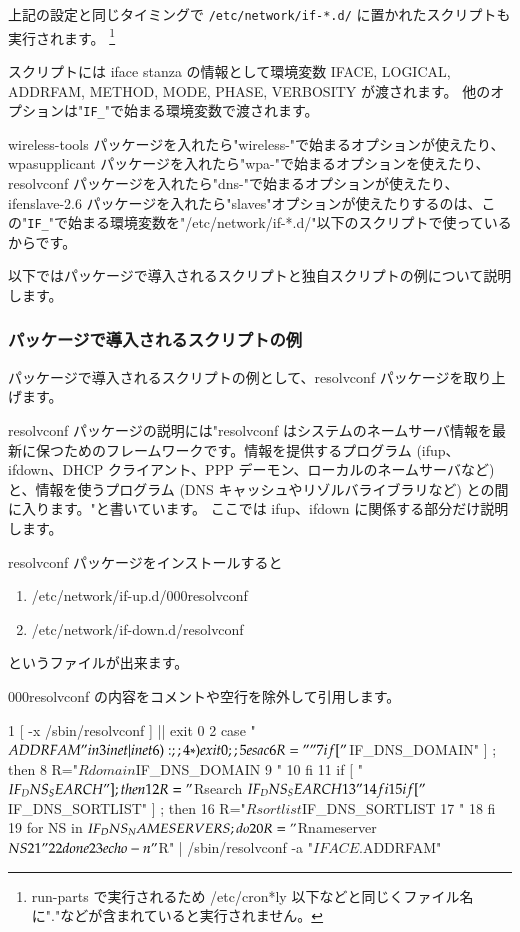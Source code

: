 \documentclass[mingoth,a4paper,twoside]{jsarticle}
\begin{document}
上記の設定と同じタイミングで \verb+/etc/network/if-*.d/+ に置かれたスクリプトも実行されます。
\footnote{run-parts で実行されるため /etc/cron*ly 以下などと同じくファイル名に"."などが含まれていると実行されません。}

スクリプトには iface stanza の情報として環境変数 IFACE, LOGICAL, ADDRFAM, METHOD, MODE, PHASE, VERBOSITY が渡されます。
他のオプションは"\verb+IF_+"で始まる環境変数で渡されます。

wireless-tools パッケージを入れたら"wireless-"で始まるオプションが使えたり、wpasupplicant パッケージを入れたら"wpa-"で始まるオプションを使えたり、resolvconf パッケージを入れたら"dns-"で始まるオプションが使えたり、ifenslave-2.6 パッケージを入れたら"slaves"オプションが使えたりするのは、この"\verb+IF_+"で始まる環境変数を"/etc/network/if-*.d/"以下のスクリプトで使っているからです。

以下ではパッケージで導入されるスクリプトと独自スクリプトの例について説明します。

\subsubsection{パッケージで導入されるスクリプトの例}
パッケージで導入されるスクリプトの例として、resolvconf パッケージを取り上げます。

resolvconf パッケージの説明には"resolvconf はシステムのネームサーバ情報を最新に保つためのフレームワークです。情報を提供するプログラム (ifup、ifdown、DHCP クライアント、PPP デーモン、ローカルのネームサーバなど) と、情報を使うプログラム (DNS キャッシュやリゾルバライブラリなど) との間に入ります。"と書いています。
ここでは ifup、ifdown に関係する部分だけ説明します。

resolvconf パッケージをインストールすると
\begin{enumerate}
\item /etc/network/if-up.d/000resolvconf
\item /etc/network/if-down.d/resolvconf
\end{enumerate}
というファイルが出来ます。

000resolvconf の内容をコメントや空行を除外して引用します。

\begin{commandline}
     1  [ -x /sbin/resolvconf ] || exit 0
     2  case "$ADDRFAM" in
     3    inet|inet6) : ;;
     4    *) exit 0 ;;
     5  esac
     6  R=""
     7  if [ "$IF_DNS_DOMAIN" ] ; then
     8          R="${R}domain $IF_DNS_DOMAIN
     9  "
    10  fi
    11  if [ "$IF_DNS_SEARCH" ] ; then
    12          R="${R}search $IF_DNS_SEARCH
    13  "
    14  fi
    15  if [ "$IF_DNS_SORTLIST" ] ; then
    16          R="${R}sortlist $IF_DNS_SORTLIST
    17  "
    18  fi
    19  for NS in $IF_DNS_NAMESERVERS ; do
    20          R="${R}nameserver $NS
    21  "
    22  done
    23  echo -n "$R" | /sbin/resolvconf -a "${IFACE}.${ADDRFAM}"
\end{commandline}
\end{document}
